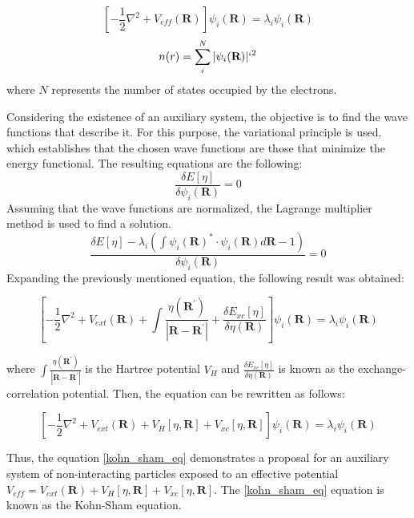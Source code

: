 \begin{equation}
    \left[-\frac{1}{2}\nabla^{2} + V_{eff}(\textbf{R})\right ] \psi_{i}(\textbf{R}) = \lambda _{i} \psi_{i}(\textbf{R})
\end{equation}
\begin{equation}
    n (r) = \sum _{i} ^{N} |\psi_{i}(\textbf{R})| `^{2}
\end{equation}
where $N$ represents the number of states occupied by the electrons.

Considering the existence of an auxiliary system, the objective is to find the wave functions that describe it. For this purpose, the variational principle is used, which establishes that the chosen wave functions are those that minimize the energy functional. The resulting equations are the following:
\begin{equation}
    \frac{\delta E[\eta]}{\delta \psi _{i}(\textbf{R})} = 0
\end{equation}
Assuming that the wave functions are normalized, the Lagrange multiplier method is used to find a solution.
\begin{equation}
    \frac{\delta E[\eta] -\lambda _{i}(\int \psi _{i} (\textbf{R}) ^{*} \cdot \psi _{i} (\textbf{R})d\textbf{R} -1 ) }{ \delta \psi _{i}(\textbf{R})} = 0
\end{equation}
Expanding the previously mentioned equation, the following result was obtained:

\begin{equation}
\left[-\frac{1}{2}\nabla^2 + V_{ext}(\mathbf{R}) + \int \frac{\eta (\mathbf{R}^{'})}{| \mathbf{R} - \mathbf{R}^{'}|} + \frac{\delta E_{xc}[\eta]}{\delta \eta (\mathbf{R})} \right]\psi_i (\mathbf{R}) = \lambda_i\psi_i(\mathbf{R})
\end{equation}

where $\int \frac{\eta (\mathbf{R}^{'})}{|\mathbf{R} - \mathbf{R}^{'}|} $ is the Hartree potential $V_{H }$ and
$\frac{\delta E_{xc}[\eta]}{\delta \eta (\mathbf{R})} $ is known as the exchange-correlation potential. Then, the equation can be rewritten as follows:

 \begin{equation}
 \label{kohn_sham_eq}
\left[-\frac{1}{2}\nabla^2 + V_{ext}(\mathbf{R}) + V_{H}[\eta,\mathbf{R}] + V_{xc}[\eta,\mathbf{R}] \right]\psi_i(\mathbf{R}) = \lambda_i\psi_i(\mathbf{R})
\end{equation}

Thus, the equation \ref{kohn_sham_eq} demonstrates a proposal for an auxiliary system of non-interacting particles exposed to an effective potential $V_{eff} = V_{ext}(\mathbf{R}) + V_{H}[\eta,\mathbf{R}] + V_{xc}[\eta,\mathbf{R}] $. The \ref{kohn_sham_eq} equation is known as the Kohn-Sham equation.

